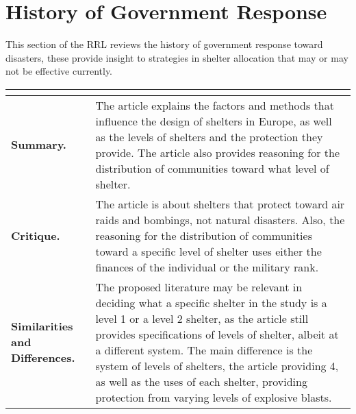 \section{History of Government Response}

This section of the RRL reviews the history of government response toward disasters, these provide insight to strategies in shelter allocation that may or may not be effective currently.

\begin{longtable}{|L{.2\linewidth}|L{.74\linewidth}|}
	\hline
	\\ \hline
	\textbf{Summary.} & The article explains the factors and methods that influence the design of shelters in Europe, as well as the levels of shelters and the protection they provide. The article also provides reasoning for the distribution of communities toward what level of shelter.\\ \hline
	\textbf{Critique.} & The article is about shelters that protect toward air raids and bombings, not natural disasters. Also, the reasoning for the distribution of communities toward a specific level of shelter uses either the finances of the individual or the military rank.\\ \hline
	\textbf{Similarities and Differences.} & The proposed literature may be relevant in deciding what a specific shelter in the study is a level 1 or a level 2 shelter, as the article still provides specifications of levels of shelter, albeit at a different system. The main difference is the system of levels of shelters, the article providing 4, as well as the uses of each shelter, providing protection from varying levels of explosive blasts. \\ \hline
\end{longtable}

